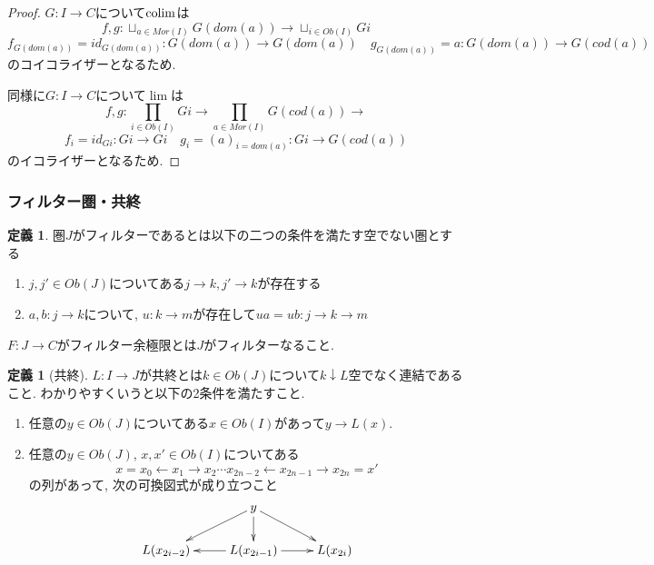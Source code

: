\documentclass[dvipdfmx,a4paper,11pt]{article}
\newcommand{\colim}{{\rm colim}}
\theoremstyle{definition}
\newtheorem{dfn}[thm]{定義}
\begin{document}
\begin{proof}
$G : I \to C$について$\colim$は
$$
f,g : \sqcup_{a\in Mor(I)} G(dom(a)) \to \sqcup_{i \in Ob(I)} Gi 
$$
$$
f_{G(dom(a)) }=id_{G(dom(a))} : G(dom(a)) \to G(dom(a))
\quad g_{G(dom(a))}=a : G(dom(a)) \to G(cod(a))
$$
のコイコライザーとなるため. 

同様に$G : I \to C$について$\lim$は
$$
f,g : \prod_{i \in Ob(I)} Gi  \to \prod_{a\in Mor(I)} G(cod(a)) \to 
$$
$$
f_{i}=id_{Gi} : Gi\to Gi
\quad g_{i}=(a)_{i = dom(a)} : Gi\to G(cod(a))
$$
のイコライザーとなるため. 
\end{proof}



\subsubsection{フィルター圏・共終}


 \begin{tcolorbox}
 [colback = white, colframe = green!35!black, fonttitle = \bfseries,breakable = true]
\begin{dfn}
圏$J$がフィルターであるとは以下の二つの条件を満たす空でない圏とする
\begin{enumerate}
\item $j, j' \in Ob(J)$についてある$j \to k, j' \to k$が存在する
\item $a, b: j \to k$について, $u: k \to m$が存在して$ua = ub : j \to k \to m$
\end{enumerate}

$F : J \to C$がフィルター余極限とは$J$がフィルターなること.
\end{dfn}
\end{tcolorbox}




 \begin{tcolorbox}
 [colback = white, colframe = green!35!black, fonttitle = \bfseries,breakable = true]
\begin{dfn}[共終]
\label{dfn-cofiinal-category}
$L : I \to J$が共終とは$k \in Ob(J)$について$k \downarrow L$空でなく連結であること.
わかりやすくいうと以下の2条件を満たすこと.
\begin{enumerate}
\item 任意の$y\in Ob(J)$についてある$x \in Ob(I)$があって$y \to L(x)$.
\item  任意の$y\in Ob(J)$, $x, x' \in Ob(I)$についてある
$$
x=x_0 \leftarrow x_1 \to x_2 \cdots x_{2n-2} \leftarrow x_{2n-1} \to x_{2n}=x'
$$
の列があって, 次の可換図式が成り立つこと
\begin{equation*}
\xymatrix@C=25pt@R=20pt{
& y\ar@{->}[ld]\ar@{->}[d]\ar@{->}[rd]
&
\\
L(x_{2i-2})
&L(x_{2i-1})\ar@{->}[l]\ar@{->}[r]
&L(x_{2i}) \\   
}
\end{equation*}
\end{enumerate}
\end{dfn}
\end{tcolorbox}
\end{document}
